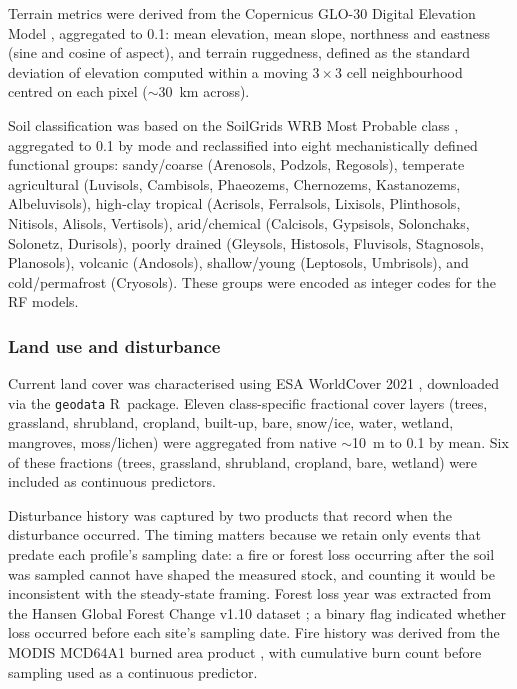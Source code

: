\documentclass[12pt, a4paper]{article}
\begin{document}
Terrain metrics were derived from the Copernicus GLO-30 Digital
Elevation Model \citep{CopernicusDEM2022}, aggregated to
0.1\textdegree{}: mean elevation, mean slope, northness and eastness
(sine and cosine of aspect), and terrain ruggedness, defined as the
standard deviation of elevation
computed within a moving $3 \times 3$ cell neighbourhood centred on each
pixel ($\sim$30~km across).

Soil classification was based on the SoilGrids WRB Most Probable class
\citep[250\,m;][]{Poggio2021}, aggregated to 0.1\textdegree{} by mode
and reclassified into eight mechanistically defined functional groups:
sandy/coarse (Arenosols, Podzols, Regosols), temperate agricultural
(Luvisols, Cambisols, Phaeozems, Chernozems, Kastanozems,
Albeluvisols), high-clay tropical (Acrisols, Ferralsols, Lixisols,
Plinthosols, Nitisols, Alisols, Vertisols), arid/chemical (Calcisols,
Gypsisols, Solonchaks, Solonetz, Durisols), poorly drained (Gleysols,
Histosols, Fluvisols, Stagnosols, Planosols), volcanic (Andosols),
shallow/young (Leptosols, Umbrisols), and cold/permafrost (Cryosols).
These groups were encoded as integer codes for the RF models.

\subsubsection{Land use and disturbance}

Current land cover was characterised using ESA WorldCover 2021
\citep{Zanaga2022}, downloaded via the \texttt{geodata} R~package.
Eleven class-specific fractional cover layers (trees, grassland,
shrubland, cropland, built-up, bare, snow/ice, water, wetland,
mangroves, moss/lichen) were aggregated from native ${\sim}$10~m to
0.1\textdegree{} by mean. Six of these fractions (trees, grassland,
shrubland, cropland, bare, wetland) were included as continuous
predictors.

Disturbance history was captured by two products that record when the
disturbance occurred. The timing matters because we retain only events
that predate each profile's sampling date: a fire or forest loss
occurring after the soil was sampled cannot have shaped the measured
stock, and counting it would be inconsistent with the steady-state
framing. Forest loss year was extracted from the Hansen Global Forest Change v1.10 dataset
\citep{Hansen2013}; a binary flag indicated whether loss occurred before
each site's sampling date. Fire history was derived from the MODIS
MCD64A1 burned area product \citep[2001--2020;][]{Giglio2018}, with
cumulative burn count before sampling used as a continuous predictor.
\end{document}
